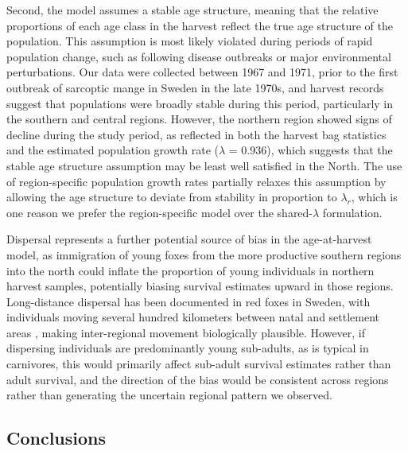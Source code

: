 \documentclass[12pt,a4paper,final,abstract=true,headings=small]{scrartcl}
\begin{document}
Second, the model assumes a stable age structure, meaning that the relative
proportions of each age class in the harvest reflect the true age structure
of the population. This assumption is most likely violated during periods
of rapid population change, such as following disease outbreaks or major
environmental perturbations. Our data were collected between 1967 and 1971,
prior to the first outbreak of sarcoptic mange in Sweden in the late 1970s,
and harvest records suggest that populations were broadly stable during this
period, particularly in the southern and central regions. However, the
northern region showed signs of decline during the study period, as reflected
in both the harvest bag statistics and the estimated population growth rate
($\lambda$ = 0.936), which suggests that the stable age structure assumption
may be least well satisfied in the North. The use of region-specific
population growth rates partially relaxes this assumption by allowing the
age structure to deviate from stability in proportion to $\lambda_r$, which
is one reason we prefer the region-specific model over the
shared-$\lambda$ formulation.

Dispersal represents a further potential source of bias in the age-at-harvest
model, as immigration of young foxes from the more productive southern regions
into the north could inflate the proportion of young individuals in northern
harvest samples, potentially biasing survival estimates upward in those
regions. Long-distance dispersal has been documented in red foxes in Sweden,
with individuals moving several hundred kilometers between natal and settlement
areas \citep{waltonLongdistanceDispersalRed2018}, making inter-regional
movement biologically plausible. However, if dispersing individuals are
predominantly young sub-adults, as is typical in carnivores, this would
primarily affect sub-adult survival estimates rather than adult survival,
and the direction of the bias would be consistent across regions rather than
generating the uncertain regional pattern we observed.

\subsection*{Conclusions}
\end{document}
